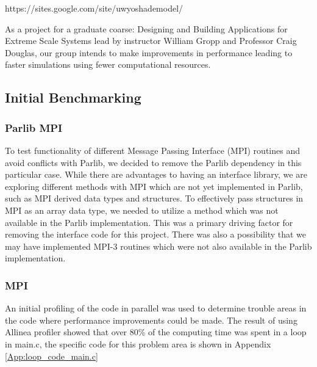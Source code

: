 \documentclass[]{article}%
\begin{document}
https://sites.google.com/site/uwyoshademodel/

As a project for a graduate coarse: Designing and Building Applications for Extreme Scale Systems lead by instructor William Gropp and Professor Craig Douglas, our group intends to make improvements in performance leading to faster simulations using fewer computational resources.


\subsection{Initial Benchmarking}

\subsubsection{Parlib MPI}

To test functionality of different Message Passing Interface (MPI) routines and avoid conflicts with Parlib, we decided to remove the Parlib dependency in this particular case. While there are advantages to having an interface library, we are exploring different methods with MPI which are not yet implemented in Parlib, such as MPI derived data types and structures. To effectively pass structures in MPI as an array data type, we needed to utilize a method which was not available in the Parlib implementation. This was a primary driving factor for removing the interface code for this project. There was also a possibility that we may have implemented MPI-3 routines which were not also available in the Parlib implementation.

\subsubsection{MPI}

An initial profiling of the code in parallel was used to determine trouble areas in the code where performance improvements could be made. The result of using Allinea profiler showed that over 80\% of the computing time was spent in a loop in main.c, the specific code for this problem area is shown in Appendix \ref{App:loop_code_main.c}
\end{document}
